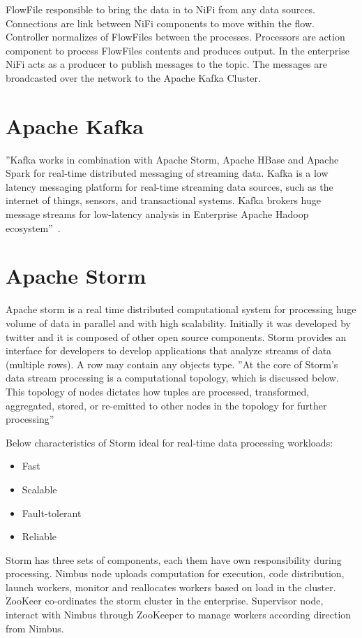 FlowFile responsible to bring the data in to NiFi from any data sources. 
Connections are link between NiFi components to move within the flow. 
Controller normalizes of FlowFiles between the processes.  Processors are 
action component to process FlowFiles contents and produces output. 
In the enterprise NiFi acts as a producer to publish messages to the topic. 
The messages are broadcasted over the network to the Apache Kafka Cluster.
 
 
\section{Apache Kafka}
''Kafka works in combination with Apache Storm, Apache HBase and Apache 
Spark for real-time distributed messaging of streaming data. 
Kafka is a low latency messaging platform for real-time streaming data sources, 
such as the internet of things, sensors, 
and transactional systems. Kafka brokers huge message streams for low-latency 
analysis in Enterprise Apache Hadoop ecosystem''~\cite{hid-sp18-514-hwp}.
 
\section{Apache Storm}
Apache storm is a real time distributed computational system for processing huge volume of data in parallel 
and with high scalability. Initially it was developed by twitter and it is composed of other open source components.
Storm provides an interface for developers to develop applications that analyze streams of data (multiple rows). 
A row may contain any objects type.
''At the core of Storm’s data stream processing is a computational topology, which is discussed below. 
This topology of nodes dictates how tuples are processed, transformed, aggregated, stored, or re-emitted to 
other nodes in the topology for further processing''~\cite{hid-sp18-514-hwp}

Below characteristics of Storm ideal for real-time data processing workloads:

\begin{itemize}
\item Fast
\item Scalable
\item Fault-tolerant
\item Reliable
\end{itemize}
 
Storm has three sets of components, each them have own responsibility during processing. Nimbus node uploads 
computation for execution, code distribution, launch workers, monitor and reallocates 
workers based on load in the cluster.
ZooKeer co-ordinates the storm cluster in the enterprise. Supervisor node, 
interact with Nimbus through ZooKeeper to manage workers according direction from Nimbus.

